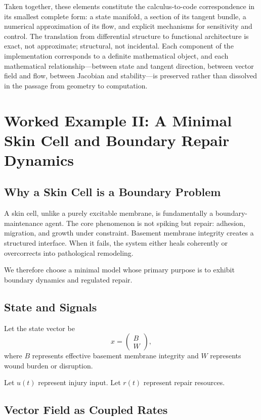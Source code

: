 \documentclass[12pt]{book}
\begin{document}
Taken together, these elements constitute the calculus-to-code
correspondence in its smallest complete form: a state manifold, a section
of its tangent bundle, a numerical approximation of its flow, and explicit
mechanisms for sensitivity and control. The translation from differential
structure to functional architecture is exact, not approximate; structural,
not incidental. Each component of the implementation corresponds to a
definite mathematical object, and each mathematical relationship---between state and tangent direction, between vector field and flow, between
Jacobian and stability---is preserved rather than dissolved in the
passage from geometry to computation.

\chapter{Worked Example II: A Minimal Skin Cell and Boundary Repair Dynamics}

\section{Why a Skin Cell is a Boundary Problem}

A skin cell, unlike a purely excitable membrane, is fundamentally a boundary-maintenance agent. The core phenomenon is not spiking but repair: adhesion, migration, and growth under constraint. Basement membrane integrity creates a structured interface. When it fails, the system either heals coherently or overcorrects into pathological remodeling.

We therefore choose a minimal model whose primary purpose is to exhibit boundary dynamics and regulated repair.

\section{State and Signals}

Let the state vector be
\[
x=
\begin{pmatrix}
B\\
W
\end{pmatrix},
\]
where $B$ represents effective basement membrane integrity and $W$ represents wound burden or disruption.

Let $u(t)$ represent injury input. Let $r(t)$ represent repair resources.

\section{Vector Field as Coupled Rates}
\end{document}
